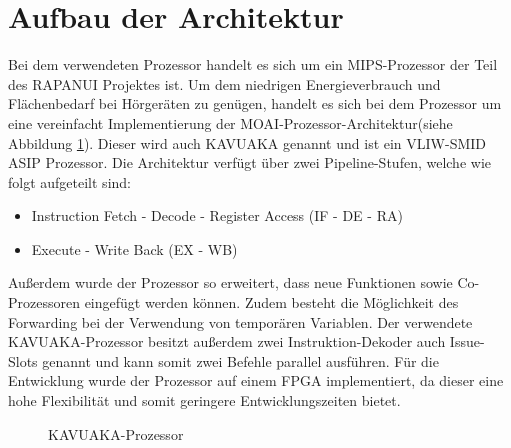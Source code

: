 \section{Aufbau der Architektur}
\label{chap:architecture_overview}
Bei dem verwendeten Prozessor handelt es sich um ein MIPS-Prozessor der Teil des RAPANUI Projektes ist.
Um dem niedrigen Energieverbrauch und Flächenbedarf bei Hörgeräten zu genügen, handelt es sich bei dem Prozessor um eine vereinfacht Implementierung der MOAI-Prozessor-Architektur(siehe Abbildung \ref{fig:KAVUAKA}). Dieser wird auch KAVUAKA genannt und ist ein VLIW-SMID ASIP Prozessor. Die Architektur verfügt über zwei Pipeline-Stufen, welche wie folgt aufgeteilt sind: 
\begin{itemize}
	\item[1.] Instruction Fetch - Decode - Register Access (IF - DE - RA) 
	\item[2.] Execute - Write Back (EX - WB)
\end{itemize}
Außerdem wurde der Prozessor so erweitert, dass neue Funktionen sowie Co-Prozessoren eingefügt werden können. Zudem besteht die Möglichkeit des Forwarding bei der Verwendung von temporären Variablen.
Der verwendete KAVUAKA-Prozessor besitzt außerdem zwei Instruktion-Dekoder auch Issue-Slots genannt und kann somit zwei Befehle parallel ausführen.
Für die Entwicklung wurde der Prozessor auf einem FPGA implementiert, da dieser eine hohe Flexibilität und somit geringere Entwicklungszeiten bietet.\cite{lukasglitches2017}

\begin{scriptsize}
	\begin{figure}[htbp] 
		\centering
		
		\caption{KAVUAKA-Prozessor \cite{lukasglitches2017}}
		\label{fig:KAVUAKA}
	\end{figure}
\end{scriptsize}


